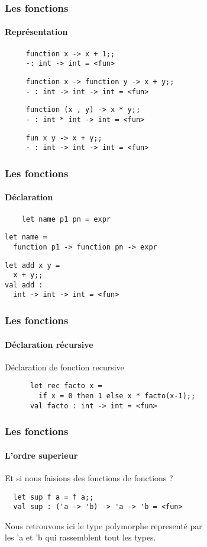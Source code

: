 \begin{frame}[fragile]
	\frametitle{Les fonctions}
	\framesubtitle{Représentation}
	\begin{center}
		\begin{minipage}{10cm}
				\begin{lstlisting}
     function x -> x + 1;;
     -: int -> int = <fun>
				\end{lstlisting}
				\begin{lstlisting}
     function x -> function y -> x + y;;
     - : int -> int -> int = <fun>
				\end{lstlisting}
				\begin{lstlisting}
     function (x , y) -> x * y;;
     - : int * int -> int = <fun>
				\end{lstlisting}
				\begin{lstlisting}
     fun x y -> x + y;;
     - : int -> int -> int = <fun>
				\end{lstlisting}
		\end{minipage}
  \end{center}
\end{frame}

\begin{frame}[fragile]
\frametitle{Les fonctions}
  \framesubtitle{Déclaration}
    \begin{lstlisting}
	let name p1 pn = expr
    \end{lstlisting}
\begin{lstlisting}
let name = 
  function p1 -> function pn -> expr
  \end{lstlisting}
  \vspace{0.4cm}
  \begin{lstlisting}
let add x y = 
  x + y;;
val add : 
  int -> int -> int = <fun>
  \end{lstlisting}
\end{frame}

\begin{frame}[fragile]
	\frametitle{Les fonctions}
	\framesubtitle{Déclaration récursive}
	\begin{block}{Déclaration de fonction recursive} 
	  \begin{lstlisting}
	  let rec facto x = 
	  	if x = 0 then 1 else x * facto(x-1);;
	  val facto : int -> int = <fun>
	  \end{lstlisting}
	\end{block}
\end{frame}

\begin{frame}[fragile]
\frametitle{Les fonctions}
  \framesubtitle{L'ordre superieur}
  Et si nous faisions des fonctions de fonctions ? 
 \begin{lstlisting}
  let sup f a = f a;;
  val sup : ('a -> 'b) -> 'a -> 'b = <fun>
 \end{lstlisting}
 Nous retrouvons ici le type polymorphe representé par\\
 les 'a et 'b qui rassemblent tout les types.
\end{frame}

